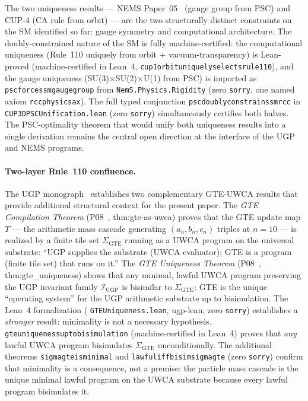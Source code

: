 \documentclass[11pt]{article}
\theoremstyle{remark}
\newcommand{\lean}[1]{%
  \penalty-100
  \begingroup\def\_{\textunderscore\allowbreak}\texttt{#1}\endgroup}
\begin{document}
The two uniqueness results --- NEMS Paper~05~\cite{SpivackUGP2024} (gauge group from PSC) and CUP-4 (CA rule
from orbit) --- are the two structurally distinct constraints on the SM identified so
far: gauge symmetry and computational architecture. The doubly-constrained nature of the SM
is fully machine-certified:
the computational uniqueness (Rule~110 uniquely from orbit + vacuum-transparency) is
Lean-proved (machine-certified in Lean~4, \lean{cup1\_orbit\_uniquely\_selects\_rule110}), and the gauge
uniqueness (SU(3)$\times$SU(2)$\times$U(1) from PSC) is imported as
\lean{psc\_forces\_sm\_gauge\_group} from \lean{NemS.Physics.Rigidity} (zero \texttt{sorry}, one named axiom \lean{rcc\_physics\_ax}).
The full typed conjunction \lean{psc\_doubly\_constrains\_sm\_rcc} in
\lean{CUP3DPSCUnification.lean} (zero \texttt{sorry})
simultaneously certifies both halves.
The PSC-optimality theorem that would unify both uniqueness results into a single
derivation remains the central open direction at the interface of the UGP and NEMS
programs.

\paragraph{Two-layer Rule~110 confluence.}
The UGP monograph~\cite{SpivackUGPFormalization} establishes two complementary
GTE-UWCA results that provide additional structural context for the present paper.
The \emph{GTE Compilation Theorem} (P08~\cite{SpivackUGP2025}, thm:gte-as-uwca) proves that the GTE update
map $T$ --- the arithmetic mass cascade generating $(a_n,b_n,c_n)$ triples at $n=10$
--- is realized by a finite tile set $\Sigma_{\mathrm{GTE}}$ running as a UWCA program
on the universal substrate: ``UGP supplies the substrate (UWCA evaluator); GTE is a
program (finite tile set) that runs on it.'' The \emph{GTE Uniqueness Theorem} (P08~\cite{SpivackUGP2025},
thm:gte\_uniqueness) shows that any minimal, lawful UWCA program preserving the UGP
invariant family $\mathcal{I}_{\mathrm{UGP}}$ is bisimilar to $\Sigma_{\mathrm{GTE}}$:
GTE is the unique ``operating system'' for the UGP arithmetic substrate up to
bisimulation.
The Lean~4 formalization (\lean{GTEUniqueness.lean}, ugp-lean, zero \texttt{sorry}) establishes a \emph{stronger}
result: minimality is not a necessary hypothesis.
\lean{gte\_uniqueness\_up\_to\_bisimulation} (machine-certified in Lean~4) proves that \emph{any} lawful
UWCA program bisimulates $\Sigma_{\mathrm{GTE}}$ unconditionally.
The additional theorems \lean{sigma\_gte\_is\_minimal} and
\lean{lawful\_iff\_bisim\_sigma\_gte} (zero \texttt{sorry}) confirm that
minimality is a consequence, not a premise: the particle mass cascade is the unique
minimal lawful program on the UWCA substrate because every lawful program bisimulates it.
\end{document}
